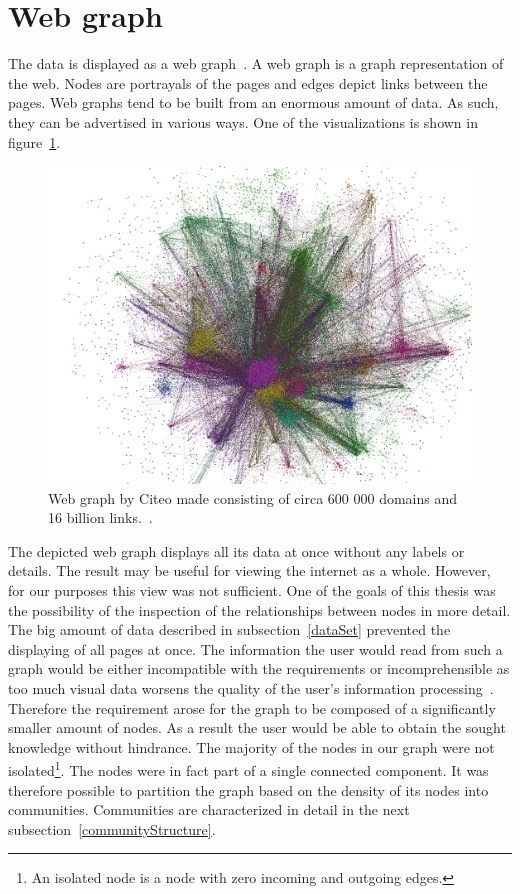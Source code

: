 \section{Web graph} \label{webGraph}
The data is displayed as a web graph~\cite{the_web_graph_overview}. A web graph is a graph representation of the web. Nodes are portrayals of the pages and edges depict links between the pages. Web graphs tend to be built from an enormous amount of data. As such, they can be advertised in various ways. One of the visualizations is shown in figure~\ref{hugeWebGraphFireworks}. 
\begin{figure}[ht!]
  \centering
  \includegraphics[width=\textwidth]{Images/hugeWebGraphFireworks.png}
  \caption{Web graph by Citeo made consisting of circa 600 000 domains and 16 billion links.~\cite{hugeWebGraphFireworks}.}
  \label{hugeWebGraphFireworks}
\end{figure} 
The depicted web graph displays all its data at once without any labels or details. The result may be useful for viewing the internet as a whole. However, for our purposes this view was not sufficient. One of the goals of this thesis was the possibility of the inspection of the relationships between nodes in more detail. The big amount of data described in subsection~\ref{dataSet} prevented the displaying of all pages at once. The information the user would read from such a graph would be either incompatible with the requirements or incomprehensible as too much visual data worsens the quality of the user's information processing~\cite{informationCluttering}. Therefore the requirement arose for the graph to be composed of a significantly smaller amount of nodes. As a result the user would be able to obtain the sought knowledge without hindrance. The majority of the nodes in our graph were not isolated\footnote{An isolated node is a node with zero incoming and outgoing edges.}. The nodes were in fact part of a single connected component. It was therefore possible to partition the graph based on the density of its nodes into communities. Communities are characterized in detail in the next subsection~\ref{communityStructure}.

